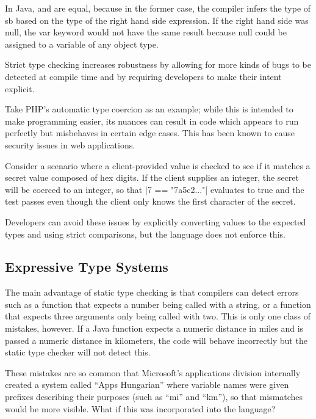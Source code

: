 \documentclass[11pt]{report}
\begin{document}
In Java,  and  are equal, because in the former case, the compiler infers the type of sb based on the type of the right hand side expression. If the right hand side was null, the var keyword would not have the same result because null could be assigned to a variable of any object type.

Strict type checking increases robustness by allowing for more kinds of bugs to be detected at compile time and by requiring developers to make their intent explicit.

Take PHP's automatic type coercion as an example; while this is intended to make programming easier, its nuances can result in code which appears to run perfectly but misbehaves in certain edge cases. This has been known to cause security issues in web applications\cite{PHPTypeJugglingErrors}.

Consider a scenario where a client-provided value is checked to see if it matches a secret value composed of hex digits. If the client supplies an integer, the secret will be coerced to an integer, so that |7 == "7a5c2..."| evaluates to true and the test passes even though the client only knows the first character of the secret.

Developers can avoid these issues by explicitly converting values to the expected types and using strict comparisons, but the language does not enforce this.

\subsection{Expressive Type Systems}

The main advantage of static type checking is that compilers can detect errors such as a function that expects a number being called with a string, or a function that expects three arguments only being called with two. This is only one class of mistakes, however. If a Java function expects a numeric distance in miles and is passed a numeric distance in kilometers, the code will behave incorrectly but the static type checker will not detect this.

These mistakes are so common that Microsoft's applications division internally created a system called “Apps Hungarian”\cite{AppsHungarian} where variable names were given prefixes describing their purposes (such as “mi” and “km”), so that mismatches would be more visible. What if this was incorporated into the language?
\end{document}
